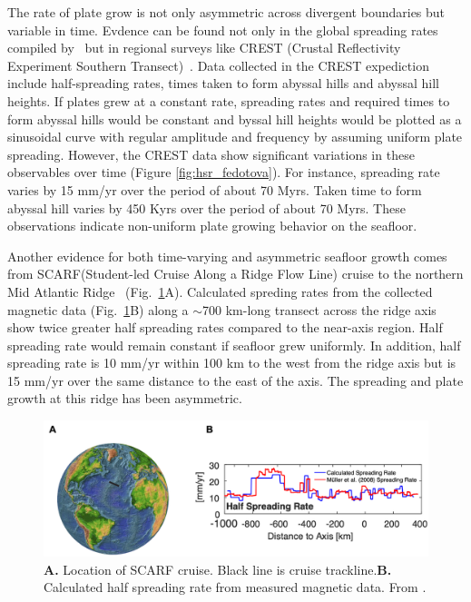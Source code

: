 \documentclass[letterpaper,12pt,notitle]{memphisthesis}                     %
\begin{document}
The rate of plate grow is not only asymmetric across divergent boundaries but variable in time. Evdence can be found not only in the global spreading rates compiled by~\citet{Muller2008} but in regional surveys like CREST (Crustal Reflectivity Experiment Southern Transect)~\citep{Fedotova2017}. Data collected in the CREST expediction include half-spreading rates, times taken to form abyssal hills and abyssal hill heights. If plates grew at a constant rate, spreading rates and required times to form abyssal hills would be constant and byssal hill heights would be plotted as a sinusoidal curve with regular amplitude and frequency by assuming uniform plate spreading. However, the CREST data show significant variations in these observables over time (Figure \ref{fig:hsr_fedotova}). For instance, spreading rate varies by 15 mm/yr over the period of about 70 Myrs. Taken time to form abyssal hill varies by 450 Kyrs over the period of about 70 Myrs. These observations indicate non-uniform plate growing behavior on the seafloor.

Another evidence for both time-varying and asymmetric seafloor growth comes from SCARF(Student-led Cruise Along a Ridge Flow Line) cruise to the northern Mid Atlantic Ridge~\citep{Shinevar2018} (Fig.~\ref{fig:scarf}A). Calculated spreding rates from the collected magnetic data (Fig.~\ref{fig:scarf}B) along a $\sim$700 km-long transect across the ridge axis show twice greater half spreading rates compared to the near-axis region. Half spreading rate would remain constant if seafloor grew uniformly. In addition, half spreading rate is 10 mm/yr within 100 km to the west from the ridge axis but is 15 mm/yr over the same distance to the east of the axis. The spreading and plate growth at this ridge has been asymmetric. 
%
\begin{figure}[!htb]
	\centering
	\includegraphics[width=0.85\linewidth]{./figs/scarf.png}
	\caption{\textbf{A.} Location of SCARF cruise. Black line is cruise trackline.\textbf{B.} Calculated half spreading rate from measured magnetic data. From \citet{Shinevar2018}.}
	\label{fig:scarf}
\end{figure}
\end{document}
